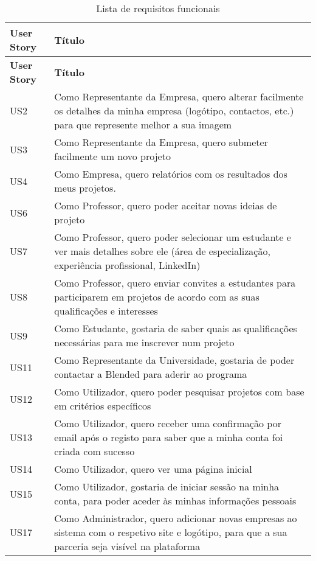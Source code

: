 \begin{landscape}
\begin{longtable}{lp{20cm}}
\caption{Lista de requisitos funcionais}
    \hline
    \textbf{User Story} & \textbf{Título} \\ \hline
    \endfirsthead

    \hline
    \textbf{User Story} & \textbf{Título} \\ \hline
    \endhead

    US2 & Como Representante da Empresa, quero alterar facilmente os detalhes da minha empresa (logótipo, contactos, etc.) para que represente melhor a sua imagem \\ \hline
    US3 & Como Representante da Empresa, quero submeter facilmente um novo projeto \\ \hline
    US4 & Como Empresa, quero relatórios com os resultados dos meus projetos. \\ \hline
    US6 & Como Professor, quero poder aceitar novas ideias de projeto \\ \hline
    US7 & Como Professor, quero poder selecionar um estudante e ver mais detalhes sobre ele (área de especialização, experiência profissional, LinkedIn) \\ \hline
    US8 & Como Professor, quero enviar convites a estudantes para participarem em projetos de acordo com as suas qualificações e interesses \\ \hline
    US9 & Como Estudante, gostaria de saber quais as qualificações necessárias para me inscrever num projeto \\ \hline
    US11 & Como Representante da Universidade, gostaria de poder contactar a Blended para aderir ao programa \\ \hline
    US12 & Como Utilizador, quero poder pesquisar projetos com base em critérios específicos \\ \hline
    US13 & Como Utilizador, quero receber uma confirmação por email após o registo para saber que a minha conta foi criada com sucesso \\ \hline
    US14 & Como Utilizador, quero ver uma página inicial \\ \hline
    US15 & Como Utilizador, gostaria de iniciar sessão na minha conta, para poder aceder às minhas informações pessoais \\ \hline
    US17 & Como Administrador, quero adicionar novas empresas ao sistema com o respetivo site e logótipo, para que a sua parceria seja visível na plataforma \\ \hline

\end{longtable}
\end{landscape}
